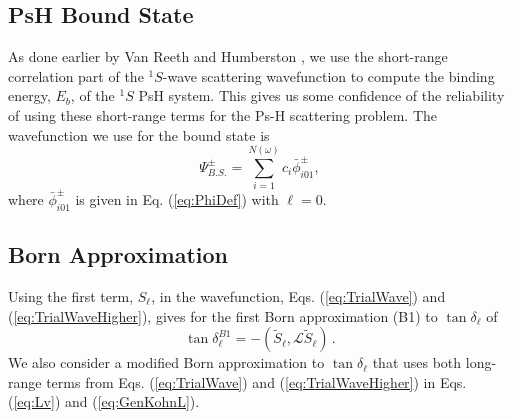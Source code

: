 \documentclass[preprint,showpacs,showkeys,preprintnumbers,amsmath,amssymb,longbibliography,pra,aps]{revtex4-1}
\begin{document}
{\subsection{PsH Bound State}
As done earlier by Van Reeth and Humberston \cite{VanReeth2003,VanReeth2004},
we use the short-range correlation part of the $^1S$-wave scattering wavefunction
to compute the binding energy, $E_b$, of the $^1S$ PsH system. This gives us
some confidence of the reliability of using these short-range terms for the Ps-H 
scattering problem. The wavefunction we use for the bound state is
\begin{equation}
\label{eq:BoundWavefn}
\Psi_{B.S.}^\pm = \sum_{i=1}^{N(\omega)} c_i \bar{\phi}_{i01}^\pm,
\end{equation}
where $\bar{\phi}_{i01}^\pm$ is given in Eq. (\ref{eq:PhiDef}) with
$\ell = 0$.

\subsection{Born Approximation}
Using the first term, $S_\ell$, in the wavefunction,
Eqs. (\ref{eq:TrialWave}) and (\ref{eq:TrialWaveHigher}), gives for the first
Born approximation (B1) to $\tan\delta_\ell$ of \cite{Bransden2003}
\begin{equation}
\label{eq:Born}
\tan\delta_\ell^{B1} = -(\widetilde{S}_\ell,\mathcal{L}\widetilde{S}_\ell )\,.
\end{equation}
We also consider a modified Born approximation to $\tan\delta_\ell$ that uses both long-range terms
from Eqs. (\ref{eq:TrialWave}) and (\ref{eq:TrialWaveHigher}) in Eqs.
(\ref{eq:Lv}) and (\ref{eq:GenKohnL}).

}
\end{document}
